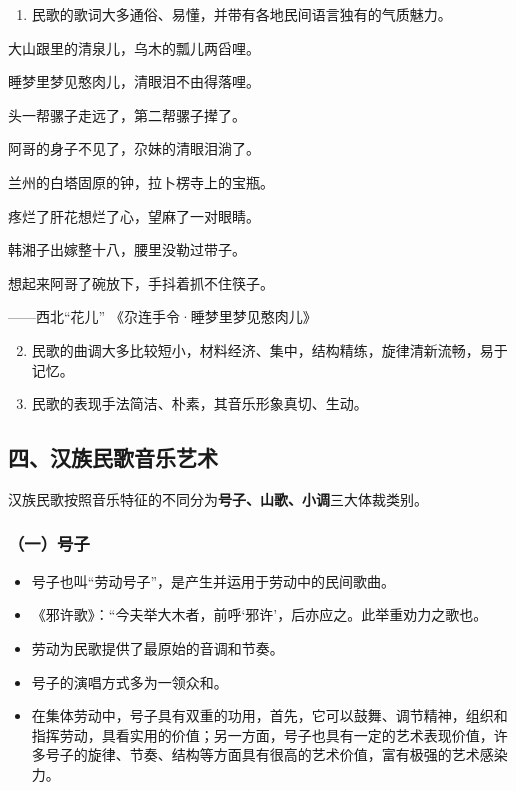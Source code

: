 \documentclass[
]{article}
\providecommand{\tightlist}{%
  \setlength{\itemsep}{0pt}\setlength{\parskip}{0pt}}
\begin{document}
\begin{enumerate}
\tightlist
\item
  民歌的歌词大多通俗、易懂，并带有各地民间语言独有的气质魅力。
\end{enumerate}

大山跟里的清泉儿，乌木的瓢儿两舀哩。

睡梦里梦见憨肉儿，清眼泪不由得落哩。

头一帮骡子走远了，第二帮骡子撵了。

阿哥的身子不见了，尕妹的清眼泪淌了。

兰州的白塔固原的钟，拉卜楞寺上的宝瓶。

疼烂了肝花想烂了心，望麻了一对眼睛。

韩湘子出嫁整十八，腰里没勒过带子。

想起来阿哥了碗放下，手抖着抓不住筷子。

------西北``花儿'' 《尕连手令·睡梦里梦见憨肉儿》

\begin{enumerate}
\setcounter{enumi}{1}
\tightlist
\item
  民歌的曲调大多比较短小，材料经济、集中，结构精练，旋律清新流畅，易于记忆。
\item
  民歌的表现手法简洁、朴素，其音乐形象真切、生动。
\end{enumerate}

\subsection{四、汉族民歌音乐艺术}\label{ux56dbux6c49ux65cfux6c11ux6b4cux97f3ux4e50ux827aux672f}

汉族民歌按照音乐特征的不同分为\textbf{号子、山歌、小调}三大体裁类别。

\subsubsection{（一）号子}\label{ux4e00ux53f7ux5b50}

\begin{itemize}
\tightlist
\item
  号子也叫``劳动号子''，是产生并运用于劳动中的民间歌曲。
\item
  《邪许歌》：``今夫举大木者，前呼`邪许'，后亦应之。此举重劝力之歌也。
\item
  劳动为民歌提供了最原始的音调和节奏。
\item
  号子的演唱方式多为一领众和。
\item
  在集体劳动中，号子具有双重的功用，首先，它可以鼓舞、调节精神，组织和指挥劳动，具看实用的价值；另一方面，号子也具有一定的艺术表现价值，许多号子的旋律、节奏、结构等方面具有很高的艺术价值，富有极强的艺术感染力。
\end{itemize}
\end{document}
